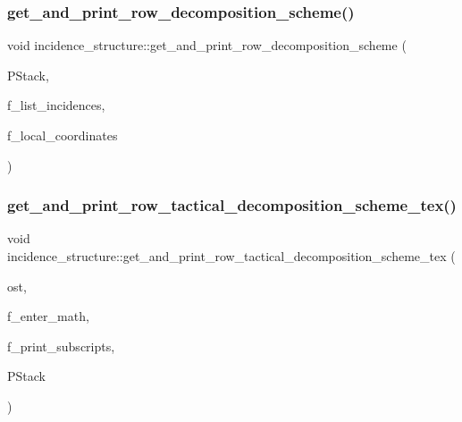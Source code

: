 \subsubsection{\texorpdfstring{get\+\_\+and\+\_\+print\+\_\+row\+\_\+decomposition\+\_\+scheme()}{get\_and\_print\_row\_decomposition\_scheme()}}
{\footnotesize\ttfamily void incidence\+\_\+structure\+::get\+\_\+and\+\_\+print\+\_\+row\+\_\+decomposition\+\_\+scheme (\begin{DoxyParamCaption}\item[{\mbox{\hyperlink{classpartitionstack}{partitionstack}} \&}]{P\+Stack,  }\item[{\mbox{\hyperlink{galois_8h_a09fddde158a3a20bd2dcadb609de11dc}{I\+NT}}}]{f\+\_\+list\+\_\+incidences,  }\item[{\mbox{\hyperlink{galois_8h_a09fddde158a3a20bd2dcadb609de11dc}{I\+NT}}}]{f\+\_\+local\+\_\+coordinates }\end{DoxyParamCaption})}

\mbox{\label{classincidence__structure_a93bcc4c9c4ebb9635a60b2c5df9c43b0}} 
\subsubsection{\texorpdfstring{get\+\_\+and\+\_\+print\+\_\+row\+\_\+tactical\+\_\+decomposition\+\_\+scheme\+\_\+tex()}{get\_and\_print\_row\_tactical\_decomposition\_scheme\_tex()}}
{\footnotesize\ttfamily void incidence\+\_\+structure\+::get\+\_\+and\+\_\+print\+\_\+row\+\_\+tactical\+\_\+decomposition\+\_\+scheme\+\_\+tex (\begin{DoxyParamCaption}\item[{ostream \&}]{ost,  }\item[{\mbox{\hyperlink{galois_8h_a09fddde158a3a20bd2dcadb609de11dc}{I\+NT}}}]{f\+\_\+enter\+\_\+math,  }\item[{\mbox{\hyperlink{galois_8h_a09fddde158a3a20bd2dcadb609de11dc}{I\+NT}}}]{f\+\_\+print\+\_\+subscripts,  }\item[{\mbox{\hyperlink{classpartitionstack}{partitionstack}} \&}]{P\+Stack }\end{DoxyParamCaption})}

